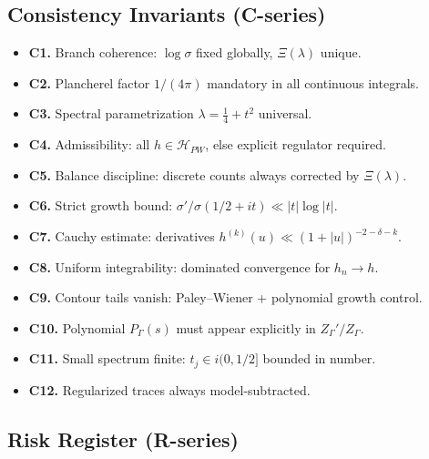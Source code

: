 
\subsection{Consistency Invariants (C-series)}

\begin{itemize}
  \item \textbf{C1.} Branch coherence: $\log\sigma$ fixed globally, $\Xi(\lambda)$ unique.
  \item \textbf{C2.} Plancherel factor $1/(4\pi)$ mandatory in all continuous integrals.
  \item \textbf{C3.} Spectral parametrization $\lambda=\tfrac{1}{4}+t^2$ universal.
  \item \textbf{C4.} Admissibility: all $h\in\mathcal{H}_{PW}$, else explicit regulator required.
  \item \textbf{C5.} Balance discipline: discrete counts always corrected by $\Xi(\lambda)$.
  \item \textbf{C6.} Strict growth bound: $\sigma'/\sigma(1/2+it)\ll |t|\log|t|$.
  \item \textbf{C7.} Cauchy estimate: derivatives $h^{(k)}(u)\ll (1+|u|)^{-2-\delta-k}$.
  \item \textbf{C8.} Uniform integrability: dominated convergence for $h_n\to h$.
  \item \textbf{C9.} Contour tails vanish: Paley–Wiener + polynomial growth control.
  \item \textbf{C10.} Polynomial $P_\Gamma(s)$ must appear explicitly in $Z_\Gamma'/Z_\Gamma$.
  \item \textbf{C11.} Small spectrum finite: $t_j\in i(0,1/2]$ bounded in number.
  \item \textbf{C12.} Regularized traces always model-subtracted.
\end{itemize}


\subsection{Risk Register (R-series)}

